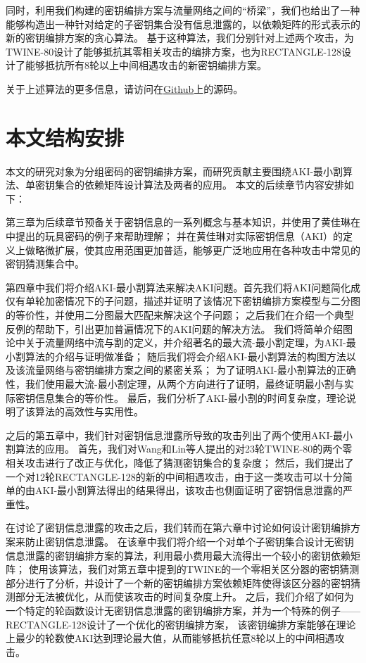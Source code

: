 同时，利用我们构建的密钥编排方案与流量网络之间的“桥梁”，我们也给出了一种能够构造出一种针对给定的子密钥集合没有信息泄露的，以依赖矩阵的形式表示的新的密钥编排方案的贪心算法。
基于这种算法，我们分别针对上述两个攻击，为TWINE-80设计了能够抵抗其零相关攻击的编排方案，也为RECTANGLE-128设计了能够抵抗所有8轮以上中间相遇攻击的新密钥编排方案。

关于上述算法的更多信息，请访问在\href{https://github.com/KirisameNanami/AKI-Algorithms}{Github}上的源码。

\section{本文结构安排}
本文的研究对象为分组密码的密钥编排方案，而研究贡献主要围绕AKI-最小割算法、单密钥集合的依赖矩阵设计算法及两者的应用。
本文的后续章节内容安排如下：

第三章为后续章节预备关于密钥信息的一系列概念与基本知识，并使用了黄佳琳在中提出的玩具密码的例子来帮助理解；
并在黄佳琳对实际密钥信息（AKI）的定义上做略微扩展，使其应用范围更加普适，能够更广泛地应用在各种攻击中常见的密钥猜测集合中。

第四章中我们将介绍AKI-最小割算法来解决AKI问题。首先我们将AKI问题简化成仅有单轮加密情况下的子问题，描述并证明了该情况下密钥编排方案模型与二分图的等价性，并使用二分图最大匹配来解决这个子问题；
之后我们在介绍一个典型反例的帮助下，引出更加普遍情况下的AKI问题的解决方法。
我们将简单介绍图论中关于流量网络中流与割的定义，并介绍著名的最大流-最小割定理，为AKI-最小割算法的介绍与证明做准备；
随后我们将会介绍AKI-最小割算法的构图方法以及该流量网络与密钥编排方案之间的紧密关系；
为了证明AKI-最小割算法的正确性，我们使用最大流-最小割定理，从两个方向进行了证明，最终证明最小割与实际密钥信息集合的等价性。
最后，我们分析了AKI-最小割的时间复杂度，理论说明了该算法的高效性与实用性。

之后的第五章中，我们针对密钥信息泄露所导致的攻击列出了两个使用AKI-最小割算法的应用。
首先，我们对Wang和Lin等人提出的对23轮TWINE-80的两个零相关攻击进行了改正与优化，降低了猜测密钥集合的复杂度；
然后，我们提出了一个对12轮RECTANGLE-128的新的中间相遇攻击，由于这一类攻击可以十分简单的由AKI-最小割算法得出的结果得出，该攻击也侧面证明了密钥信息泄露的严重性。

在讨论了密钥信息泄露的攻击之后，我们转而在第六章中讨论如何设计密钥编排方案来防止密钥信息泄露。
在该章中我们将介绍一个对单个子密钥集合设计无密钥信息泄露的密钥编排方案的算法，利用最小费用最大流得出一个较小的密钥依赖矩阵；
使用该算法，我们对第五章中提到的TWINE的一个零相关区分器的密钥猜测部分进行了分析，并设计了一个新的密钥编排方案依赖矩阵使得该区分器的密钥猜测部分无法被优化，从而使该攻击的时间复杂度上升。
之后，我们介绍了如何为一个特定的轮函数设计无密钥信息泄露的密钥编排方案，并为一个特殊的例子——RECTANGLE-128设计了一个优化的密钥编排方案，
该密钥编排方案能够在理论上最少的轮数使AKI达到理论最大值，从而能够抵抗任意8轮以上的中间相遇攻击。

